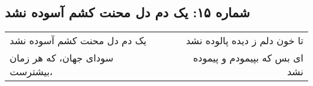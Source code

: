 \begin{center}
\section*{شماره ۱۵: یک دم دل محنت کشم آسوده نشد}
\label{sec:015}
\begin{longtable}{l p{0.5cm} r}
یک دم دل محنت کشم آسوده نشد
&&
تا خون دلم ز دیده پالوده نشد
\\
سودای جهان، که هر زمان بیشترست،
&&
ای بس که بپیمودم و پیموده نشد
\\
\end{longtable}
\end{center}
